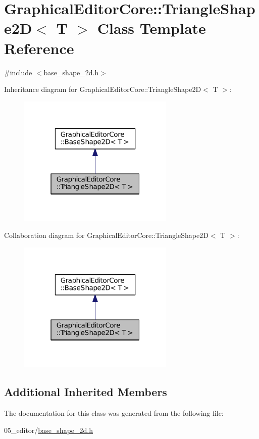 \hypertarget{classGraphicalEditorCore_1_1TriangleShape2D}{}\section{Graphical\+Editor\+Core\+:\+:Triangle\+Shape2D$<$ T $>$ Class Template Reference}
\label{classGraphicalEditorCore_1_1TriangleShape2D}


{\ttfamily \#include $<$base\+\_\+shape\+\_\+2d.\+h$>$}



Inheritance diagram for Graphical\+Editor\+Core\+:\+:Triangle\+Shape2D$<$ T $>$\+:
\nopagebreak
\begin{figure}[H]
\begin{center}
\leavevmode
\includegraphics[width=211pt]{classGraphicalEditorCore_1_1TriangleShape2D__inherit__graph}
\end{center}
\end{figure}


Collaboration diagram for Graphical\+Editor\+Core\+:\+:Triangle\+Shape2D$<$ T $>$\+:
\nopagebreak
\begin{figure}[H]
\begin{center}
\leavevmode
\includegraphics[width=211pt]{classGraphicalEditorCore_1_1TriangleShape2D__coll__graph}
\end{center}
\end{figure}
\subsection*{Additional Inherited Members}


The documentation for this class was generated from the following file\+:\begin{DoxyCompactItemize}
\item 
05\+\_\+editor/\hyperlink{base__shape__2d_8h}{base\+\_\+shape\+\_\+2d.\+h}\end{DoxyCompactItemize}
